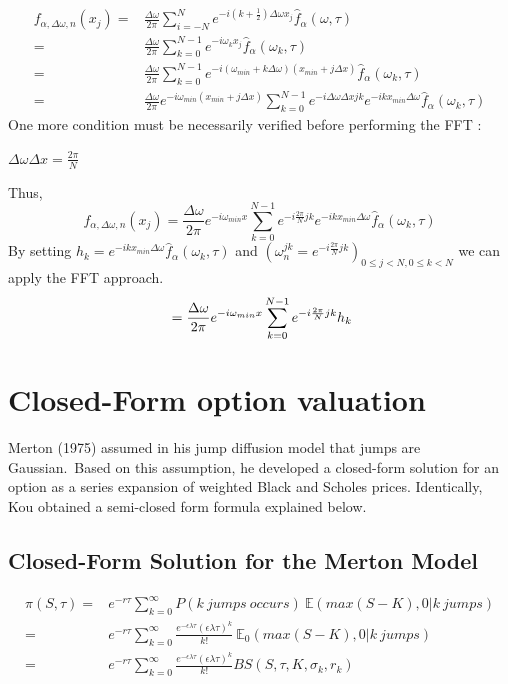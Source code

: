 \documentclass[12pt]{report}
\begin{document}
\begin{align}
f_{\alpha,\Delta \omega, n}(x_j)=&\frac{\Delta \omega}{2\pi} \sum \limits_{i=-N}^N e^{-i(k+\frac{1}{2} ) \Delta \omega x_j }\hat{f}_{\alpha}(\omega,\tau) \nonumber
\\=& \frac{\Delta \omega}{2\pi} \sum \limits_{k=0}^{N-1} e^{-i \omega_k x_j }\hat{f}_{\alpha}(\omega_k,\tau) \nonumber
\\=& \frac{\Delta \omega}{2\pi} \sum \limits_{k=0}^{N-1} e^{-i (\omega_{min}+k\Delta \omega )  (x_{min}+j\Delta x) }\hat{f}_{\alpha}(\omega_k,\tau) \nonumber
\\=&\frac{\Delta \omega}{2\pi}
\label{fret}e^{-i \omega_{min} (x_{min}+j\Delta x) } \sum \limits_{k=0}^{N-1} e^{-i\Delta \omega \Delta x j k} e^{-i k x_{min} \Delta \omega}\hat{f}_{\alpha}(\omega_k,\tau) \nonumber
\end{align}
One more condition must be necessarily verified before performing the FFT :
\begin{center}
$\Delta \omega \Delta x = \frac{2 \pi}{N}$
\end{center} 
Thus, \\
\begin{equation*}
f_{\alpha,\Delta \omega, n}(x_j)=\frac{\Delta \omega}{2\pi} e^{-i \omega_{min} x} \sum \limits_{k=0}^{N-1} e^{-i\frac{2 \pi}{N}j k} e^{-i k x_{min} \Delta \omega}\hat{f}_{\alpha}(\omega_k,\tau) 
\end{equation*}
By setting $h_k=  e^{-i k x_{min} \Delta \omega } \hat{f}_{\alpha}(\omega_k,\tau)$ and $(\omega_n^{j k}= e^{-i \frac{2\pi}{N}j k })_{0 \le j<N , 0 \le k<N}$ we can apply the FFT approach.
\begin{equation}
\\=\frac{\Delta \omega}{2\pi} e^{-i \omega_{min} x} \sum \limits_{k=0}^{N-1} e^{-i\frac{2 \pi}{N}j k} h_k
\label{4.14}
\end{equation}
\section{Closed-Form option valuation}
Merton (1975) assumed in his jump diffusion model that jumps are
Gaussian.~Based on this assumption, he developed a closed-form solution for an option as a series expansion of weighted Black and  Scholes prices. Identically, Kou obtained a semi-closed form formula explained below.
\subsection{Closed-Form Solution for the Merton Model}
\begin{align}
\label{remark_n}
\pi(S,\tau)=& e^{-r\tau} \sum \limits_{k=0}^{\infty} P(k~jumps~occurs)~\mathbb{E}(max(S-K),0|k~jumps)\\
=& e^{-r\tau} \sum \limits_{k=0}^{\infty} \frac{e^{-\epsilon \lambda \tau}(\epsilon \lambda \tau)^k}{k!} ~ \mathbb{E}_0(max(S-K),0|k~jumps)\\
=& e^{-r\tau} \sum \limits_{k=0}^{\infty} \frac{e^{-\epsilon \lambda \tau}(\epsilon \lambda \tau)^k}{k!} BS(S,\tau,K,\sigma_k,r_k)
\end{align}
\end{document}

